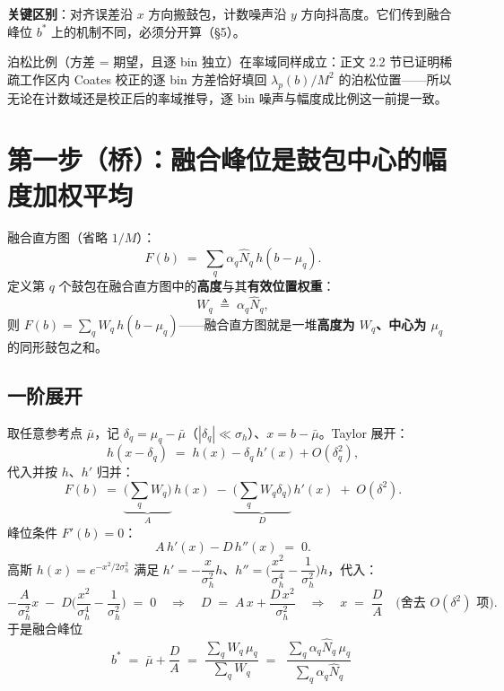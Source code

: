 \documentclass[11pt]{ctexart}
\begin{document}
\textbf{关键区别}：对齐误差沿 $x$ 方向搬鼓包，计数噪声沿 $y$ 方向抖高度。它们传到融合峰位 $b^*$ 上的机制不同，必须分开算（\S5）。

泊松比例（方差 = 期望，且逐 bin 独立）在率域同样成立：正文 2.2 节已证明稀疏工作区内 Coates 校正的逐 bin 方差恰好填回 $\lambda_p(b)/M^2$ 的泊松位置——所以无论在计数域还是校正后的率域推导，逐 bin 噪声与幅度成比例这一前提一致。

\section{第一步（桥）：融合峰位是鼓包中心的幅度加权平均}

融合直方图（省略 $1/M$）：
\begin{equation}
  F(b)\;=\;\sum_q \alpha_q\hat N_q\,h(b-\mu_q).
\end{equation}
定义第 $q$ 个鼓包在融合直方图中的\textbf{高度}与其\textbf{有效位置权重}：
\begin{equation}
  W_q\;\triangleq\;\alpha_q\hat N_q,
\end{equation}
则 $F(b)=\sum_q W_q\,h(b-\mu_q)$——融合直方图就是一堆\textbf{高度为 $W_q$、中心为 $\mu_q$} 的同形鼓包之和。

\subsection{一阶展开}

取任意参考点 $\bar\mu$，记 $\delta_q=\mu_q-\bar\mu$（$|\delta_q|\ll\sigma_h$）、$x=b-\bar\mu$。Taylor 展开：
\begin{equation}
  h(x-\delta_q)\;=\;h(x)-\delta_q\,h'(x)+O(\delta_q^2),
\end{equation}
代入并按 $h$、$h'$ 归并：
\begin{equation}
  F(b)\;=\;\underbrace{\Big(\sum_q W_q\Big)}_{A}\,h(x)\;-\;\underbrace{\Big(\sum_q W_q\delta_q\Big)}_{D}\,h'(x)\;+\;O(\delta^2).
\end{equation}
峰位条件 $F'(b)=0$：
\begin{equation}
  A\,h'(x)-D\,h''(x)\;=\;0.
\end{equation}
高斯 $h(x)=e^{-x^2/2\sigma_h^2}$ 满足 $h'=-\dfrac{x}{\sigma_h^2}h$、$h''=\Big(\dfrac{x^2}{\sigma_h^4}-\dfrac{1}{\sigma_h^2}\Big)h$，代入：
\begin{equation}
  -\frac{A}{\sigma_h^2}x\;-\;D\Big(\frac{x^2}{\sigma_h^4}-\frac{1}{\sigma_h^2}\Big)\;=\;0
  \quad\Longrightarrow\quad
  D\;=\;A\,x+\frac{D\,x^2}{\sigma_h^2}
  \quad\Longrightarrow\quad
  x\;=\;\frac{D}{A}\quad\big(\text{舍去 }O(\delta^2)\text{ 项}\big).
\end{equation}
于是融合峰位
\begin{equation}
  b^*\;=\;\bar\mu+\frac{D}{A}\;=\;\frac{\sum_q W_q\,\mu_q}{\sum_q W_q}
  \;=\;\boxed{\;\frac{\sum_q \alpha_q\hat N_q\,\mu_q}{\sum_q \alpha_q\hat N_q}\;}
  \label{eq:bridge}
\end{equation}
\end{document}
